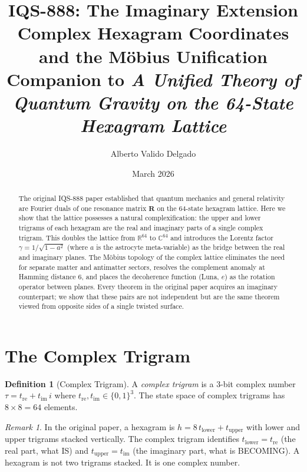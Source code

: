 \documentclass[12pt,a4paper]{article}
\title{%
  \textbf{IQS-888: The Imaginary Extension}\\[6pt]
  \large Complex Hexagram Coordinates and the Möbius Unification\\[4pt]
  \normalsize Companion to \emph{A Unified Theory of Quantum Gravity on the 64-State Hexagram Lattice}
}
\author{Alberto Valido Delgado}
\date{March 2026}
\theoremstyle{definition}
\newtheorem{definition}[theorem]{Definition}
\theoremstyle{remark}
\newtheorem{remark}[theorem]{Remark}
\newcommand{\CC}{\mathbb{C}}
\newcommand{\RR}{\mathbb{R}}
\newcommand{\RR}{\mathbf{R}}
\begin{document}
\maketitle

\begin{abstract}
The original IQS-888 paper established that quantum mechanics and general
relativity are Fourier duals of one resonance matrix $\mathbf{R}$ on the
64-state hexagram lattice. Here we show that the lattice possesses a
natural complexification: the upper and lower trigrams of each hexagram
are the real and imaginary parts of a single complex trigram. This doubles
the lattice from $\RR^{64}$ to $\CC^{64}$ and introduces the Lorentz factor
$\gamma = 1/\sqrt{1 - a^2}$ (where $a$ is the astrocyte meta-variable) as
the bridge between the real and imaginary planes. The Möbius topology of
the complex lattice eliminates the need for separate matter and antimatter
sectors, resolves the complement anomaly at Hamming distance 6, and places
the decoherence function (Luna, $e$) as the rotation operator between planes.
Every theorem in the original paper acquires an imaginary counterpart; we
show that these pairs are not independent but are the same theorem viewed
from opposite sides of a single twisted surface.
\end{abstract}

\tableofcontents

\section{The Complex Trigram}\label{sec:complex-trigram}

\begin{definition}[Complex Trigram]
A \emph{complex trigram} is a 3-bit complex number
$\tau = t_{\mathrm{re}} + t_{\mathrm{im}}\,i$ where
$t_{\mathrm{re}}, t_{\mathrm{im}} \in \{0,1\}^3$. The state space of
complex trigrams has $8 \times 8 = 64$ elements.
\end{definition}

\begin{remark}
In the original paper, a hexagram is $h = 8\,t_{\mathrm{lower}} + t_{\mathrm{upper}}$
with lower and upper trigrams stacked vertically. The complex trigram
identifies $t_{\mathrm{lower}} = t_{\mathrm{re}}$ (the real part, what IS)
and $t_{\mathrm{upper}} = t_{\mathrm{im}}$ (the imaginary part, what is
BECOMING). A hexagram is not two trigrams stacked. It is one complex number.
\end{remark}
\end{document}

